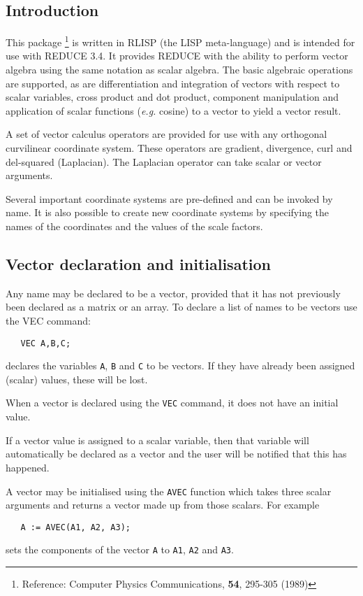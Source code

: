 \subsection{Introduction}

This package \footnote{Reference: Computer Physics Communications,
{\bf 54}, 295-305 (1989)}
is written in RLISP (the LISP meta-language) and is
intended for use with REDUCE 3.4.  It provides
REDUCE with the ability to perform vector algebra using the same
notation as scalar algebra.  The basic algebraic operations are
supported, as are differentiation and integration of vectors with
respect to scalar variables, cross product and dot product, component
manipulation and application of scalar functions ({\em e.g.} cosine)
to a vector to yield a vector result.

A set of vector calculus operators are provided for use with any
orthogonal curvilinear coordinate system. These operators are
gradient, divergence, curl and del-squared (Laplacian).  The Laplacian
operator can take scalar or vector arguments.

Several important coordinate systems are pre-defined and can be
invoked by name. It is also possible to create new coordinate systems
by specifying the names of the coordinates and the values of the scale
factors.

\subsection{Vector declaration and initialisation}

Any name may be declared to be a vector, provided that it has
not previously been declared as a matrix or an array. To
declare a list of names to be vectors use the VEC command:
\begin{verbatim}
   VEC A,B,C;
\end{verbatim}
declares the variables {\tt A}, {\tt B} and {\tt C} to be vectors.
If they have already been assigned (scalar) values, these will be lost.

When a vector is declared using the {\tt VEC} command, it does not
have an initial value.

If a vector value is assigned to a scalar variable, then that
variable will automatically be declared as a vector and the
user will be notified that this has happened.

A vector may be initialised using the {\tt AVEC} function which
takes three scalar arguments and returns a vector made up
from those scalars. For example
\begin{verbatim}
   A := AVEC(A1, A2, A3);
\end{verbatim}
sets the components of the vector {\tt A} to {\tt A1}, {\tt A2} and {\tt A3}.

